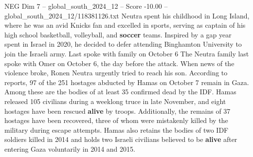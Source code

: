 \begin{textsample}{NEG Dim 7 – global\_south\_2024\_12 – Score -10.00 – global\_south\_2024\_12/118381126.txt}
Neutra spent his childhood in Long Island, where he was an avid Knicks fan and excelled in sports, serving as captain of his high school basketball, volleyball, and \textbf{soccer} teams.
Inspired by a gap year spent in Israel in 2020, he decided to defer attending Binghamton University to join the Israeli army.
Last spoke with family on October 6 The Neutra family last spoke with Omer on October 6, the day before the attack.
When news of the violence broke, Ronen Neutra urgently tried to reach his son.
According to reports, 97 of the 251 hostages abducted by Hamas on October 7 remain in Gaza.
Among these are the bodies of at least 35 confirmed dead by the IDF.
Hamas released 105 civilians during a weeklong truce in late November, and eight hostages have been rescued \textbf{alive} by troops.
Additionally, the remains of 37 hostages have been recovered, three of whom were mistakenly killed by the military during escape attempts.
Hamas also retains the bodies of two IDF soldiers killed in 2014 and holds two Israeli civilians believed to be \textbf{alive} after entering Gaza voluntarily in 2014 and 2015.

\end{textsample}

